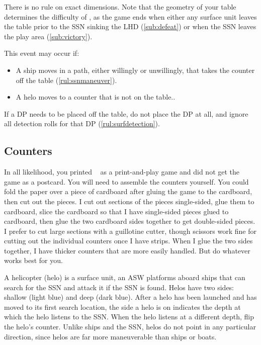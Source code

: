 \documentclass[../TacSubMicroRules.tex]{subfiles}
\begin{document}
There is no rule on exact dimensions.
Note that the geometry of your table determines the difficulty of \gametitle, as the game ends when either any surface unit leaves the table prior to the SSN sinking the LHD (\ref{sub:defeat}) or when the SSN leaves the play area (\ref{sub:victory}).

 
This event may occur if:
\begin{itemize}
    \item A ship moves in a path, either willingly or unwillingly, that takes the counter off the table (\ref{rul:ssnmaneuver}).
    \item A helo moves to a counter that is not on the table..
\end{itemize}
If a DP needs to be placed off the table, do not place the DP at all, and ignore all detection rolls for that DP (\ref{rul:surfdetection}).

\subsection{Counters}%
\label{sub:counters}


\begin{design}
    In all likelihood, you printed \gametitle~ as a print-and-play game and did not get the game as a postcard.
    You will need to assemble the counters yourself.
    You could fold the paper over a piece of cardboard after gluing the game to the cardboard, then cut out the pieces.
    I cut out sections of the pieces single-sided, glue them to cardboard, slice the cardboard so that I have single-sided pieces glued to cardboard, then glue the two cardboard sides together to get double-sided pieces.
    I prefer to cut large sections with a guillotine cutter, though scissors work fine for cutting out the individual counters once I have strips.
    When I glue the two sides together, I have thicker counters that are more easily handled.
    But do whatever works best for you.
\end{design}

 A helicopter (helo) is a surface unit, an ASW platforms aboard ships that can search for the SSN and attack it if the SSN is found.
Helos have two sides: shallow (light blue) and deep (dark blue).
After a helo has been launched and has moved to its first search location, the side a helo is on indicates the depth at which the helo listens to the SSN.
When the helo listens at a different depth, flip the helo's counter.
Unlike ships and the SSN, helos do not point in any particular direction, since helos are far more maneuverable than ships or boats.
\end{document}
